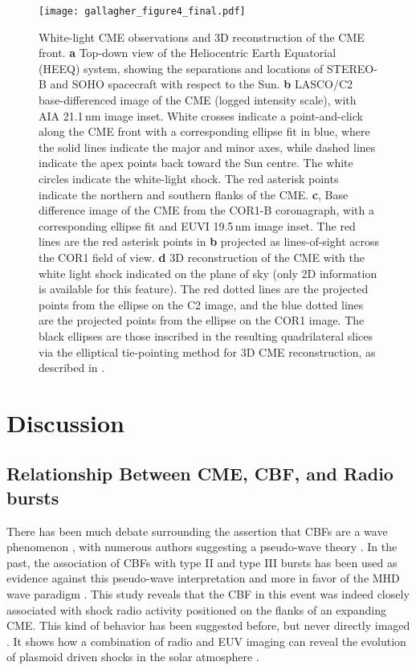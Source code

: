 \begin{figure}[!h]
\begin{center}
\texttt{[image: gallagher\_figure4\_final.pdf]}
\caption[3D reconstruction of CME and white-light shock]{White-light CME observations and 3D reconstruction of the CME front. {\bf a} Top-down view of the Heliocentric Earth Equatorial (HEEQ) system, showing the separations and locations of STEREO-B and SOHO spacecraft with respect to the Sun. {\bf b} LASCO/C2 base-differenced image of the CME (logged intensity scale), with AIA 21.1\,nm image inset. White crosses indicate a point-and-click along the CME front with a corresponding ellipse fit in blue, where the solid lines indicate the major and minor axes, while dashed lines indicate the apex points back toward the Sun centre. The white circles indicate the white-light shock. The red asterisk points indicate the northern and southern flanks of the CME. {\bf c}, Base difference image of the CME from the COR1-B coronagraph, with a corresponding ellipse fit and EUVI 19.5\,nm image inset. The red lines are the red asterisk points in {\bf b} projected as lines-of-sight across the COR1 field of view. {\bf d} 3D reconstruction of the CME with the white light shock indicated on the plane of sky (only 2D information is available for this feature). The red dotted lines are the projected points from the ellipse on the C2 image, and the blue dotted lines are the projected points from the ellipse on the COR1 image. The black ellipses are those inscribed in the resulting quadrilateral slices via the elliptical tie-pointing method for 3D CME reconstruction, as described in \citep{byrne2010}.}
\label{fig:3d_cme}
\end{center}
\end{figure}
\clearpage


\section{Discussion}

\subsection{Relationship Between CME, CBF, and Radio bursts}\label{sec:31}

There has been much debate surrounding the assertion that CBFs are a wave phenomenon \citep{gallagher2011}, with numerous authors suggesting a pseudo-wave theory \citep{delannee2008}. In the past, the association of CBFs with type II and type III bursts has been used as evidence against this pseudo-wave interpretation and more in favor of the MHD wave paradigm \citep{warmuth2004b, grechnev2011}. This study reveals that the CBF in this event was indeed closely associated with shock radio activity positioned on the flanks of an expanding CME. This kind of behavior has been suggested before, but never directly imaged \citep{kozarev2011, feng2012, feng2013}. It shows how a combination of radio and EUV imaging can reveal the evolution of plasmoid driven shocks in the solar atmosphere \citep{bain2012}.

